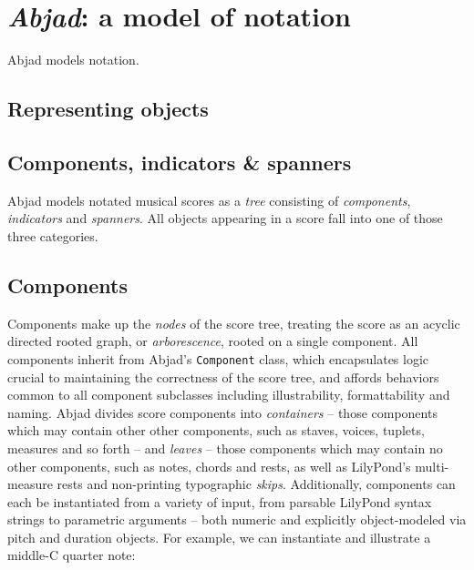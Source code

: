 \chapter{\emph{Abjad}: a model of notation}
\label{chap:a-model-of-notation}

Abjad models notation.

\section{Representing objects}

\begin{comment}
-   print()
-   repr() and \_\_repr\_\_()
-   str() and \_\_str\_\_()
-   format() and \_\_format\_\_()
-   show() and \_\_illustrate\_\_()
-   graph() and \_\_graph\_\_()
\end{comment}

\section{Components, indicators \& spanners}

Abjad models notated musical scores as a \emph{tree} consisting of
\emph{components}, \emph{indicators} and \emph{spanners}. All objects appearing
in a score fall into one of those three categories.

\section{Components}

Components make up the \emph{nodes} of the score tree, treating the score as an
acyclic directed rooted graph, or \emph{arborescence}, rooted on a single
component. All components inherit from Abjad's \texttt{Component} class, which
encapsulates logic crucial to maintaining the correctness of the score tree,
and affords behaviors common to all component subclasses including
illustrability, formattability and naming. Abjad divides score components into
\emph{containers} -- those components which may contain other other components,
such as staves, voices, tuplets, measures and so forth -- and \emph{leaves} --
those components which may contain no other components, such as notes, chords
and rests, as well as LilyPond's multi-measure rests and non-printing
typographic \emph{skips}. Additionally, components can each be instantiated
from a variety of input, from parsable LilyPond syntax strings to parametric
arguments -- both numeric and explicitly object-modeled via pitch and duration
objects. For example, we can instantiate and illustrate a middle-C quarter
note:

